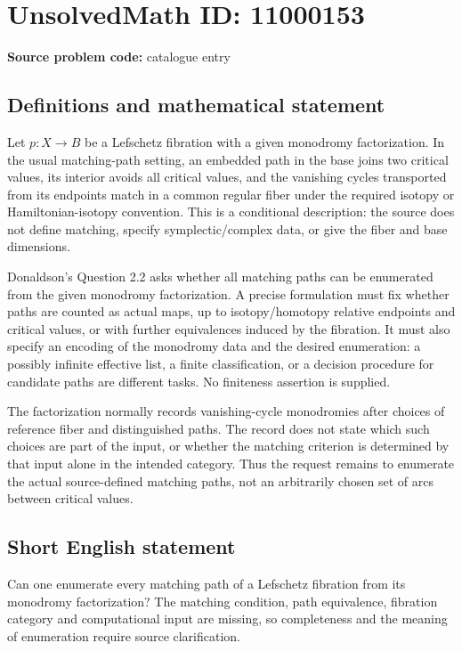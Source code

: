 \documentclass[11pt]{article}
\begin{document}
\section*{UnsolvedMath ID: 11000153}
\textbf{Source problem code:} catalogue entry
\subsection{Definitions and mathematical statement}
Let \(p:X\to B\) be a Lefschetz fibration with a given monodromy factorization. In the usual matching-path setting, an embedded path in the base joins two critical values, its interior avoids all critical values, and the vanishing cycles transported from its endpoints match in a common regular fiber under the required isotopy or Hamiltonian-isotopy convention. This is a conditional description: the source does not define matching, specify symplectic/complex data, or give the fiber and base dimensions.

Donaldson's Question 2.2 asks whether all matching paths can be enumerated from the given monodromy factorization. A precise formulation must fix whether paths are counted as actual maps, up to isotopy/homotopy relative endpoints and critical values, or with further equivalences induced by the fibration. It must also specify an encoding of the monodromy data and the desired enumeration: a possibly infinite effective list, a finite classification, or a decision procedure for candidate paths are different tasks. No finiteness assertion is supplied.

The factorization normally records vanishing-cycle monodromies after choices of reference fiber and distinguished paths. The record does not state which such choices are part of the input, or whether the matching criterion is determined by that input alone in the intended category. Thus the request remains to enumerate the actual source-defined matching paths, not an arbitrarily chosen set of arcs between critical values.
\subsection{Short English statement}
Can one enumerate every matching path of a Lefschetz fibration from its monodromy factorization? The matching condition, path equivalence, fibration category and computational input are missing, so completeness and the meaning of enumeration require source clarification.
\end{document}
